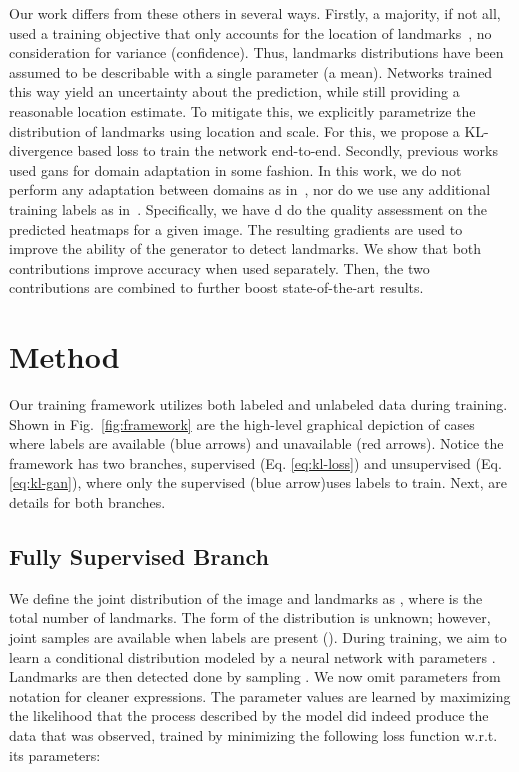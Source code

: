 \documentclass[10pt,twocolumn,letterpaper]{article}
\begin{document}
Our work differs from these others in several ways. Firstly, a majority, if not all, used a training objective that only accounts for the location of landmarks~\cite{honari2018improving,trigeorgis2016mnemonic,wang2018recurrentpami}, \ie no consideration for variance (\ie confidence). Thus, landmarks distributions have been assumed to be describable with a single parameter (\ie a mean). Networks trained this way yield an uncertainty about the prediction, while still providing a reasonable location estimate. To mitigate this, we explicitly parametrize the distribution of landmarks using location and scale. For this, we propose a KL-divergence based loss to train the network end-to-end. Secondly, previous works used \Glspl{gan} for domain adaptation in some fashion. In this work, we do not perform any adaptation between domains as in~\cite{hoffman2017cycada, shrivastava2017learning}, nor do we use any additional training labels as in~\cite{honari2018improving}. Specifically, we have \gls{d} do the quality assessment on the predicted heatmaps for a given image. The resulting gradients are used to improve the ability of the generator to detect landmarks. We show that both contributions improve accuracy when used separately. Then, the two contributions are combined to further boost state-of-the-art results.

\section{Method}
\label{sec:method}
Our training framework utilizes both labeled and unlabeled data during training. Shown in Fig.~\ref{fig:framework} are the high-level graphical depiction of cases where labels are available (blue arrows) and unavailable (red arrows). Notice the framework has two branches, supervised (Eq. \ref{eq:kl-loss}) and unsupervised (Eq. \ref{eq:kl-gan}), where only the supervised (blue arrow)uses labels to train. Next, are details for both branches.


\subsection{Fully Supervised Branch}
\label{sec:with-labels}
We define the joint distribution of the image  and landmarks  as , where  is the total number of landmarks. The form of the distribution  is unknown; however, joint samples are available when labels are present (\ie ). During training, we aim to learn a conditional distribution  modeled by a neural network with parameters . Landmarks are then detected done by sampling . We now omit parameters  from notation for cleaner expressions. The parameter values are learned by maximizing the likelihood that the process described by the model did indeed produce the data that was observed, \ie trained by minimizing the following loss function w.r.t. its parameters: 
\end{document}

